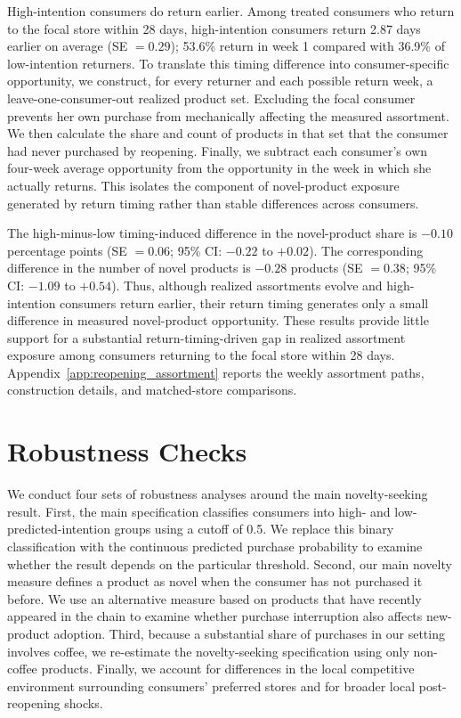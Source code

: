 \documentclass[11 pt]{article}
\begin{document}
High-intention consumers do return earlier. Among treated consumers who return to the focal store within 28 days, high-intention consumers return 2.87 days earlier on average (SE $=0.29$); 53.6\% return in week 1 compared with 36.9\% of low-intention returners. To translate this timing difference into consumer-specific opportunity, we construct, for every returner and each possible return week, a leave-one-consumer-out realized product set. Excluding the focal consumer prevents her own purchase from mechanically affecting the measured assortment. We then calculate the share and count of products in that set that the consumer had never purchased by reopening. Finally, we subtract each consumer's own four-week average opportunity from the opportunity in the week in which she actually returns. This isolates the component of novel-product exposure generated by return timing rather than stable differences across consumers.

The high-minus-low timing-induced difference in the novel-product share is $-0.10$ percentage points (SE $=0.06$; 95\% CI: $-0.22$ to $+0.02$). The corresponding difference in the number of novel products is $-0.28$ products (SE $=0.38$; 95\% CI: $-1.09$ to $+0.54$). Thus, although realized assortments evolve and high-intention consumers return earlier, their return timing generates only a small difference in measured novel-product opportunity. These results provide little support for a substantial return-timing-driven gap in realized assortment exposure among consumers returning to the focal store within 28 days. Appendix~\ref{app:reopening_assortment} reports the weekly assortment paths, construction details, and matched-store comparisons.


\section{Robustness Checks}
\label{section:Robustness Checks}

We conduct four sets of robustness analyses around the main novelty-seeking result. First, the main specification classifies consumers into high- and low-predicted-intention groups using a cutoff of 0.5. We replace this binary classification with the continuous predicted purchase probability to examine whether the result depends on the particular threshold. Second, our main novelty measure defines a product as novel when the consumer has not purchased it before. We use an alternative measure based on products that have recently appeared in the chain to examine whether purchase interruption also affects new-product adoption. Third, because a substantial share of purchases in our setting involves coffee, we re-estimate the novelty-seeking specification using only non-coffee products. Finally, we account for differences in the local competitive environment surrounding consumers' preferred stores and for broader local post-reopening shocks.
\end{document}
